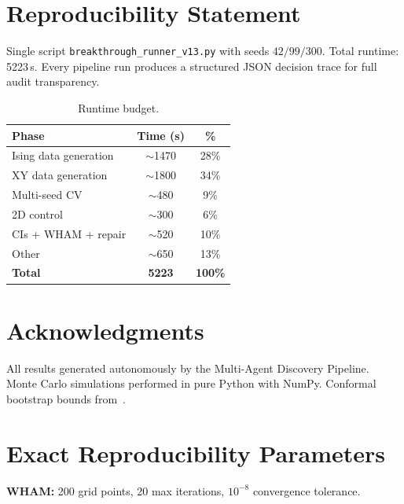 \documentclass[11pt,a4paper]{article}
\begin{document}
\section{Reproducibility Statement}\label{sec:reproducibility}

Single script \texttt{breakthrough\_runner\_v13.py} with seeds $42/99/300$. Total runtime: 5223\,s. Every pipeline run produces a structured JSON decision trace for full audit transparency.

\begin{table}[ht]
\centering
\caption{Runtime budget.}
\label{tab:runtime}
\begin{tabular}{@{}lcc@{}}
\toprule
Phase & Time (s) & \% \\
\midrule
Ising data generation & $\sim$1470 & 28\% \\
XY data generation & $\sim$1800 & 34\% \\
Multi-seed CV & $\sim$480 & 9\% \\
2D control & $\sim$300 & 6\% \\
CIs + WHAM + repair & $\sim$520 & 10\% \\
Other & $\sim$650 & 13\% \\
\midrule
\textbf{Total} & \textbf{5223} & \textbf{100\%} \\
\bottomrule
\end{tabular}
\end{table}

\section*{Acknowledgments}
All results generated autonomously by the Multi-Agent Discovery Pipeline. Monte Carlo simulations performed in pure Python with NumPy. Conformal bootstrap bounds from~\cite{kos2015,elshowk2012}.

\appendix

\section{Exact Reproducibility Parameters}\label{app:params}

\textbf{WHAM:} 200 grid points, 20 max iterations, $10^{-8}$ convergence tolerance.
\end{document}
